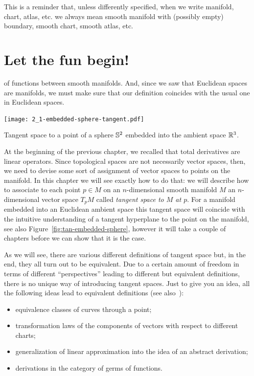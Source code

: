 
\begin{tcolorbox}
	This is a reminder that, unless differently specified, when we write manifold, chart, atlas, etc. we always mean smooth manifold with (possibly empty) boundary, smooth chart, smooth atlas, etc.
\end{tcolorbox}

\section{Let the fun begin!}
 of functions between smooth manifolds.
And, since we saw that Euclidean spaces are manifolds, we must make sure that our definition coincides with the usual one in Euclidean spaces.

\begin{marginfigure}[7em]
	\texttt{[image: 2\_1-embedded-sphere-tangent.pdf]}
	\label{fig:tan-embedded-sphere}
	\caption{Tangent space to a point of a sphere $\mathbb{S}^2$ embedded into the ambient space $\mathbb{R}^3$.}
\end{marginfigure}
At the beginning of the previous chapter, we recalled that total derivatives are linear operators.
Since topological spaces are not necessarily vector spaces, then, we need to devise some sort of assignment of vector spaces to points on the manifold.
In this chapter we will see exactly how to do that: we will describe how to associate to each point $p\in M$ on an $n$-dimensional smooth manifold $M$ an $n$-dimensional vector space $T_p M$ called \emph{tangent space to $M$ at $p$}.
For a manifold embedded into an Euclidean ambient space this tangent space will coincide with the intuitive understanding of a tangent hyperplane to the point on the manifold, see also Figure~\ref{fig:tan-embedded-sphere}, however it will take a couple of chapters before we can show that it is the case.

As we will see, there are various different definitions of tangent space but, in the end, they all turn out to be equivalent.
Due to a certain amount of freedom in terms of different ``perspectives'' leading to different but equivalent definitions, there is no unique way of introducing tangent spaces.
Just to give you an idea, all the following ideas lead to equivalent definitions (see also~\cite{book:lee}):
\begin{itemize}
	\item equivalence classes of curves through a point;
	\item transformation laws of the components of vectors with respect to different charts;
	\item generalization of linear approximation into the idea of an abstract derivation;
	\item derivations in the category of germs of functions.
\end{itemize}

